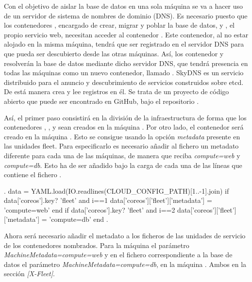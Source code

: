Con el objetivo de aislar la base de datos en una sola máquina se va a hacer uso de un servidor de sistema de nombres de dominio (DNS). Es necesario puesto que los contenedores , encargado de crear, migrar y poblar la base de datos, y , el propio servicio web, necesitan acceder al contenedor . Este contenedor, al no estar alojado en la misma máquina, tendrá que ser registrado en el servidor DNS para que pueda ser descubierto desde las otras máquinas. Así, los contenedor  y  resolverán la base de datos mediante dicho servidor DNS, que tendrá presencia en todas las máquinas como un nuevo contenedor, llamado . SkyDNS es un servicio distribuido para el anuncio y descubrimiento de servicios construidos sobre etcd. De está manera crea y lee registros en él. Se trata de un proyecto de código abierto que puede ser encontrado en GitHub, bajo el repositorio .

Así, el primer paso consistirá en la división de la infraestructura de forma que los contenedores , ,  y  sean creados en la máquina . Por otro lado, el contenedor  será creado en la máquina . Esto se consigue usando la opción \textit{metadata} presente en las unidades fleet. Para especificarlo es necesario añadir al fichero  un metadato diferente para cada una de las máquinas, de manera que  reciba \textit{compute=web} y  \textit{compute=db}. Esto ha de ser añadido bajo la carga de cada una de las líneas que contiene el fichero .

\begin{codelisting}
\label{code:vagrantfile2}
\begin{code}
.
data = YAML.load(IO.readlines(CLOUD_CONFIG_PATH)[1..-1].join)
if data['coreos'].key? 'fleet' and i==1
  data['coreos']['fleet']['metadata'] = 'compute=web'
end
if data['coreos'].key? 'fleet' and i==2
 data['coreos']['fleet']['metadata'] = 'compute=db'
end
.
\end{code}
\end{codelisting}

Ahora será necesario añadir el metadato a los ficheros de las unidades de servicio de los contenedores nombrados. Para la máquina  el parámetro \textit{MachineMetadata=compute=web} y en el fichero correspondiente a la base de datos el parámetro \textit{MachineMetadata=compute=db}, en la máquina . Ambos en la sección \textit{[X-Fleet]}.

